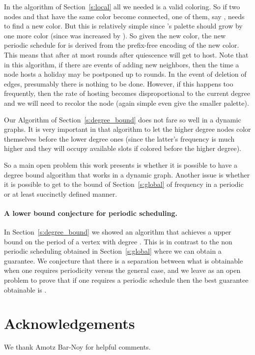 \documentclass[11pt]{article}
\begin{document}
In the algorithm of Section~\ref{s:local} all we needed is a valid coloring. So if two nodes  and  that have the same color become connected, one of them, say , needs to find a new color. But this is relatively simple since 's palette should grow by one more color (since  was increased by ). So given the new color, the new periodic schedule for  is derived from the prefix-free encoding of the new color. This means that after at most   rounds after quiescence  will get to host. Note that in this algorithm, if there are  events of adding new neighbors, then the time a node hosts a holiday may be postponed up to  rounds. In the event of deletion of edges, presumably there is nothing to be done. However, if this happens too frequently, then the rate of hosting becomes disproportional to the current degree and we will need to recolor the node (again simple even give the smaller palette).

Our Algorithm  of Section~\ref{s:degree_bound} does not fare so well in a dynamic graphs. It is very important in that algorithm to let the higher degree nodes color themselves before the lower degree ones (since the latter's frequency is much higher and they will occupy available slots if colored before the higher degree).

So a main open problem this work presents is whether it is possible to have a degree bound algorithm that works in a dynamic graph. Another issue is whether it is possible to get to the bound of Section~\ref{s:global} of frequency  in a periodic or at least succinctly defined manner.

\paragraph{A lower bound conjecture for periodic scheduling.} In Section~\ref{s:degree_bound} we showed an algorithm that achieves a  upper bound on the period of a vertex with degree . This is in contrast to the non periodic scheduling obtained in Section~\ref{s:global} where we can obtain a  guarantee. We conjecture that there is a separation between what is obtainable when one requires periodicity versus the general case, and we leave as an open problem to prove that if one requires a periodic schedule then the best guarantee obtainable is .

\section*{Acknowledgements}
We thank Amotz Bar-Noy for helpful comments.
\end{document}
